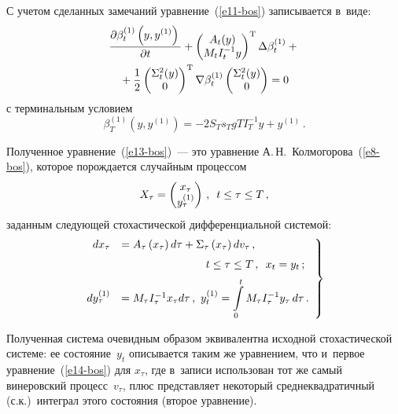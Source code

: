 \begin{multicols}{2}
     С учетом сделанных замечаний уравнение~(\ref{e11-bos}) записывается в~виде:
     \begin{multline}
     \displaystyle\frac{\displaystyle \partial \beta_t^{(1)}\left(y,y^{(1)}\right)\mathstrut}{\displaystyle \partial t\mathstrut}+ \left(
     \begin{matrix}
     A_t(y)\\ M_t I_t^{-1} y
     \end{matrix}\right)^{\mathrm{T}} \Delta \beta_t^{(1)}+{}\\
     {}+\displaystyle\frac{\displaystyle 1\mathstrut}{\displaystyle 2\mathstrut}\left(
     \begin{matrix}
     \Sigma_t^2(y)\\ 0
     \end{matrix}
     \right)^{\mathrm{T}} \nabla \beta_t^{(1)} \left( 
     \begin{matrix}
     \Sigma_t^2(y)\\ 0\end{matrix}
     \right) =0
     \label{e13-bos}
     \end{multline}
с терминальным условием 
$$
\beta_T^{(1)}\left( y, y^{(1)}\right) = -2S_T s_T gT I_T^{-1} y+y^{(1)}\,.
$$ 

Полученное уравнение~(\ref{e13-bos})~--- это уравнение А.\,Н.~Колмогорова~(\ref{e8-bos}), которое 
порождается случайным процессом 
$$
X_\tau= \begin{pmatrix}
x_\tau \\ y_\tau^{(1)}\end{pmatrix}\,,\enskip t\leq \tau\leq T\,,
$$ 
заданным следующей стохастической дифференциальной сис\-темой:
\begin{equation}
\left.
\begin{array}{rl}
\hspace*{-2mm}dx_{\tau}&=A_\tau\left( x_\tau\right) d\tau +
\Sigma_\tau\left(x_{\tau}\right)dv_{\tau}\,,\\[6pt]
& \hspace*{27mm}t\leq \tau\leq 
T\,,\enskip x_t=y_t\,;\\[6pt]
\hspace*{-2mm}dy_{\tau}^{(1)}&=M_{\tau} I_{\tau}^{-1}x_{\tau} d\tau\,,\ 
y_t^{(1)}=\displaystyle \int\limits_0^t M_{\tau} 
I_{\tau}^{-1} y_{\tau} \,d\tau\,.
\end{array}
\right\}\!
\label{e14-bos}
\end{equation}

Полученная система очевидным образом эквивалентна исходной стохастической системе: ее 
состояние~$y_t$ описывается таким же уравнением, что и~первое уравнение~(\ref{e14-bos}) для 
$x_{\tau}$, где в~записи использован тот же самый винеровский процесс~$v_\tau$, плюс 
представляет некоторый среднеквадратичный (с.к.)\ 
ин\-те\-грал этого состояния (второе уравнение).


\end{multicols}
